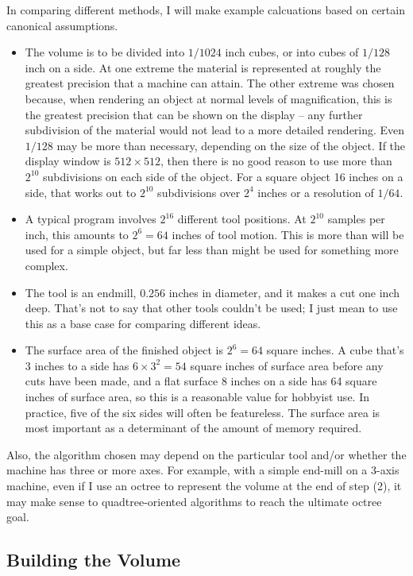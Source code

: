 \documentclass[titlepage,oneside,10pt]{article}
\begin{document}
In comparing different methods, I will make example calcuations based
on certain canonical assumptions.
\begin{itemize}
\itemsep=0pt
\item The volume is to be divided into $1/1024$ inch cubes, or into
  cubes of $1/128$ inch on a side. At one extreme the material is
  represented at roughly the greatest precision that a machine can
  attain. The other extreme was chosen because, when rendering
  an object at normal levels of magnification, this is the greatest
  precision that can be shown on the display -- any further
  subdivision of the material would not lead to a more detailed
  rendering. Even $1/128$ may be more than necessary, depending on the
  size of the object. If the display window is $512\times 512$, then
  there is no good reason to use more than $2^{10}$ subdivisions on each
  side of the object. For a square object 16 inches on a side, that
  works out to $2^{10}$ subdivisions over $2^4$ inches or a resolution
  of $1/64$.
\item A typical program involves $2^{16}$ different tool
  positions. At $2^{10}$ samples per inch, this amounts to $2^6=64$
  inches of tool motion. This is more than will be used for a simple
  object, but far less than might be used for something more complex.
\item The tool is an endmill, $0.256$ inches in diameter, and it makes
  a cut one inch deep. That's not to say that other tools couldn't be
  used; I just mean to use this as a base case for comparing different ideas.
\item The surface area of the finished object is $2^6=64$ square
  inches. A cube that's 3 inches to a side has $6\times 3^2 = 54$ square
  inches of surface area before any cuts have been made, and a flat
  surface 8 inches on a side has 64 square inches of surface area, so
  this is a reasonable value for hobbyist use. In practice,
  five of the six sides will often be featureless. The surface area is
  most important as a determinant of the amount of memory required.
\end{itemize}

Also, the algorithm chosen may depend on the particular tool and/or
whether the machine has three or more axes. For example, with a simple
end-mill on a 3-axis machine, even if I use an octree to represent the
volume at the end of step (2), it may make sense to quadtree-oriented
algorithms to reach the ultimate octree goal.

\subsection{Building the Volume}
\end{document}
